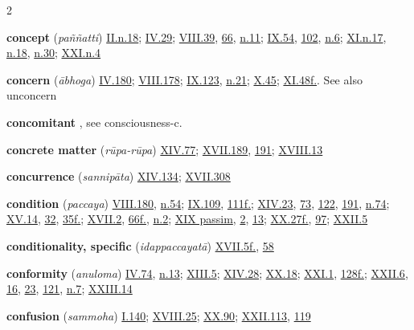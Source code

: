 \begin{multicols}{2}
\begin{vismHanging}
\par\textbf{concept} (\emph{paññatti}) \hyperlink{II.n18}{II.n.18}{}; \hyperlink{IV.29}{IV.29}{}; \hyperlink{VIII.39}{VIII.39}{}, \hyperlink{VIII.66}{66}{}, \hyperlink{VIII.n11}{n.11}{}; \hyperlink{IX.54}{IX.54}{}, \hyperlink{IX.102}{102}{}, \hyperlink{IX.n6}{n.6}{}; \hyperlink{XI.n17}{XI.n.17}{}, \hyperlink{XI.n18}{n.18}{}, \hyperlink{XI.n30}{n.30}{}; \hyperlink{XXI.n4}{XXI.n.4}{}
\par\textbf{concern} (\emph{ābhoga}) \hyperlink{IV.180}{IV.180}{}; \hyperlink{VIII.178}{VIII.178}{}; \hyperlink{IX.123}{IX.123}{}, \hyperlink{IX.n21}{n.21}{}; \hyperlink{X.45}{X.45}{}; \hyperlink{XI.48}{XI.48f.}{}. See also unconcern 
\par\textbf{concomitant} , see consciousness-c.
\par\textbf{concrete matter} (\emph{rūpa-rūpa}) \hyperlink{XIV.77}{XIV.77}{}; \hyperlink{XVII.189}{XVII.189}{}, \hyperlink{XVII.191}{191}{}; \hyperlink{XVIII.13}{XVIII.13}{}
\par\textbf{concurrence} (\emph{sannipāta}) \hyperlink{XIV.134}{XIV.134}{}; \hyperlink{XVII.308}{XVII.308}{}
\par\textbf{condition} (\emph{paccaya}) \hyperlink{VIII.180}{VIII.180}{}, \hyperlink{VIII.n54}{n.54}{}; \hyperlink{IX.109}{IX.109}{}, \hyperlink{IX.111}{111f.}{}; \hyperlink{XIV.23}{XIV.23}{}, \hyperlink{XIV.73}{73}{}, \hyperlink{XIV.122}{122}{}, \hyperlink{XIV.191}{191}{}, \hyperlink{XIV.n74}{n.74}{}; \hyperlink{XV.14}{XV.14}{}, \hyperlink{XV.32}{32}{}, \hyperlink{XV.35}{35f.}{}; \hyperlink{XVII.2}{XVII.2}{}, \hyperlink{XVII.66}{66f.}{}, \hyperlink{XVII.n2}{n.2}{}; \hyperlink{XIX}{XIX passim}{}, \hyperlink{XIX.2}{2}{}, \hyperlink{XIX.13}{13}{}; \hyperlink{XX.27}{XX.27f.}{}, \hyperlink{XX.97}{97}{}; \hyperlink{XXII.5}{XXII.5}{}
\par\textbf{conditionality, specific} (\emph{idappaccayatā}) \hyperlink{XVII.5}{XVII.5f.}{}, \hyperlink{XVII.58}{58}{}
\par\textbf{conformity} (\emph{anuloma}) \hyperlink{IV.74}{IV.74}{}, \hyperlink{IV.n13}{n.13}{}; \hyperlink{XIII.5}{XIII.5}{}; \hyperlink{XIV.28}{XIV.28}{}; \hyperlink{XX.18}{XX.18}{}; \hyperlink{XXI.1}{XXI.1}{}, \hyperlink{XXI.128}{128f.}{}; \hyperlink{XXII.6}{XXII.6}{}, \hyperlink{XXII.16}{16}{}, \hyperlink{XXII.23}{23}{}, \hyperlink{XXII.121}{121}{}, \hyperlink{XXII.n7}{n.7}{}; \hyperlink{XXIII.14}{XXIII.14}{}
\par\textbf{confusion} (\emph{sammoha}) \hyperlink{I.140}{I.140}{}; \hyperlink{XVIII.25}{XVIII.25}{}; \hyperlink{XX.90}{XX.90}{}; \hyperlink{XXII.113}{XXII.113}{}, \hyperlink{XXII.119}{119}{}

\end{vismHanging}
\end{multicols}
